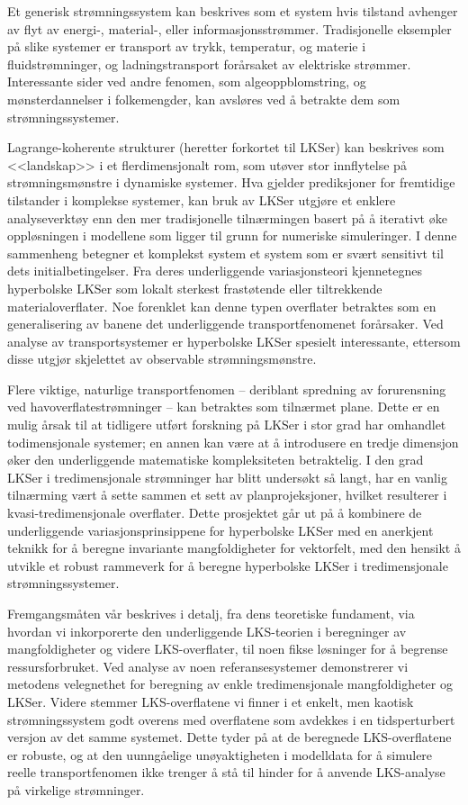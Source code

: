 \begingroup
\vspace{3mm}
Et generisk strømningssystem kan beskrives som et system hvis tilstand avhenger
av flyt av energi-, material-, eller informasjonsstrømmer. Tradisjonelle
eksempler på slike systemer er transport av trykk, temperatur, og materie i
fluidstrømninger, og ladningstransport forårsaket av elektriske strømmer.
Interessante sider ved andre fenomen, som algeoppblomstring, og
mønsterdannelser i folkemengder, kan avsløres ved å betrakte dem som
strømningssystemer.

Lagrange-koherente strukturer (heretter forkortet til LKSer) kan beskrives som
<<landskap>> i et flerdimensjonalt rom, som utøver stor innflytelse på
strømningsmønstre i dynamiske systemer. Hva gjelder prediksjoner for fremtidige
tilstander i komplekse systemer, kan bruk av LKSer utgjøre et enklere
analyseverktøy enn den mer tradisjonelle tilnærmingen basert på å
iterativt øke oppløsningen i modellene som ligger til grunn for numeriske
simuleringer. I denne sammenheng betegner et komplekst system et system som er
svært sensitivt til dets initialbetingelser. Fra deres underliggende
variasjonsteori kjennetegnes hyperbolske LKSer som lokalt sterkest frastøtende
eller tiltrekkende materialoverflater. Noe forenklet kan denne typen overflater
betraktes som en generalisering av banene det underliggende transportfenomenet
forårsaker. Ved analyse av transportsystemer er hyperbolske LKSer spesielt
interessante, ettersom disse utgjør skjelettet av observable strømningsmønstre.

Flere viktige, naturlige transportfenomen -- deriblant spredning av
forurensning ved havoverflatestrømninger -- kan betraktes som tilnærmet plane.
Dette er en mulig årsak til at tidligere utført forskning på LKSer i stor grad
har omhandlet todimensjonale systemer; en annen kan være at å introdusere en
tredje dimensjon øker den underliggende matematiske kompleksiteten betraktelig.
I den grad LKSer i tredimensjonale strømninger har blitt undersøkt så langt,
har en vanlig tilnærming vært å sette sammen et sett av planprojeksjoner,
hvilket resulterer i kvasi-tredimensjonale overflater. Dette prosjektet går ut
på å kombinere de underliggende variasjonsprinsippene for hyperbolske LKSer med
en anerkjent teknikk for å beregne invariante mangfoldigheter for vektorfelt,
med den hensikt å utvikle et robust rammeverk for å beregne hyperbolske LKSer i
tredimensjonale strømningssystemer.

Fremgangsmåten vår beskrives i detalj, fra dens teoretiske fundament, via
hvordan vi inkorporerte den underliggende LKS-teorien i beregninger av
mangfoldigheter og videre LKS-overflater, til noen fikse løsninger for å
begrense ressursforbruket. Ved analyse av noen referansesystemer demonstrerer
vi metodens velegnethet for beregning av enkle tredimensjonale mangfoldigheter
og LKSer. Videre stemmer LKS-overflatene vi finner i et enkelt, men kaotisk
strømningssystem godt overens med overflatene som avdekkes i en tidsperturbert
versjon av det samme systemet. Dette tyder på at de beregnede LKS-overflatene
er robuste, og at den uunngåelige unøyaktigheten i modelldata for å simulere
reelle transportfenomen ikke trenger å stå til hinder for å anvende LKS-analyse
på virkelige strømninger.

